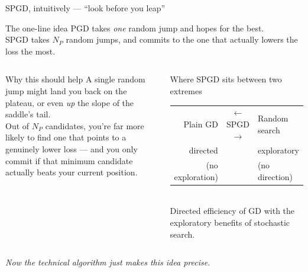 \documentclass[11pt,aspectratio=169]{beamer}
\newcommand{\np}{\ensuremath{N_P}}
\begin{document}
\begin{frame}{SPGD, intuitively --- ``look before you leap''}
  \begin{block}{The one-line idea}
    \centering
    PGD takes \emph{one} random jump and hopes for the best.\\
    \alert{SPGD takes \np{} random jumps, and commits to the one that
           actually lowers the loss the most.}
  \end{block}

  \vspace{0.5em}
  \begin{columns}[T,onlytextwidth]
      \begin{block}{Why this should help}
        \footnotesize
        A single random jump might land you back on the plateau, or even
        \emph{up} the slope of the saddle's tail.\\[0.4em]
        Out of \np{} candidates, you're far more likely to find one
        that points to a genuinely lower loss --- and you only commit
        \alert{if} that minimum candidate actually beats your current
        position.
      \end{block}
      \begin{block}{Where SPGD sits between two extremes}
        \footnotesize
        \centering
        \begin{tabular}{r c l}
          Plain GD & $\longleftarrow$ \;\alert{SPGD}\; $\longrightarrow$ & Random search \\
          \scriptsize directed & & \scriptsize exploratory \\
          \scriptsize (no exploration) & & \scriptsize (no direction)
        \end{tabular}
        \\[0.4em]
        Directed efficiency of GD with the exploratory benefits of
        stochastic search.
      \end{block}
  \end{columns}

  \vspace{0.5em}
  \pause
  \centering
  \emph{Now the technical algorithm just makes this idea precise.}
\end{frame}
\end{document}
